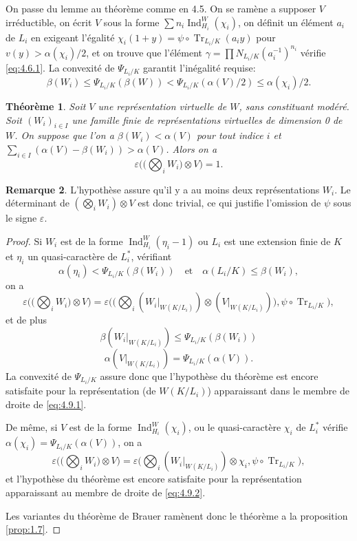\documentclass[12pt,a4paper]{article}
\theoremstyle{plain}
\newtheorem{theorem}{Th\'eor\`eme}[section]
\theoremstyle{definition}
\newtheorem{remark}[theorem]{Remarque}
\theoremstyle{remark}
\DeclareMathOperator{\Ind}{Ind}
\DeclareMathOperator{\Tr}{Tr}
\providecommand{\Tr}{\operatorname{Tr}}
\begin{document}
On passe du lemme au th\'eor\`eme comme en 4.5. On se ram\`ene a supposer $V$ irr\'eductible, on \'ecrit $V$ sous la forme $\sum n_i \Ind_{H_i}^W(\chi_i)$, on d\'efinit un \'el\'ement $a_i$ de $L_i$ en exigeant l'\'egalit\'e $\chi_i(1+y) = \psi \circ \Tr_{L_i/K}(a_i y)$ pour $v(y) > \alpha(\chi_i)/2$, et on trouve que l'\'el\'ement $\gamma = \prod N_{L_i/K}(a_i^{-1})^{n_i}$ v\'erifie \eqref{eq:4.6.1}. La convexit\'e de $\Psi_{L_i/K}$ garantit l'in\'egalit\'e requise:
\[
\beta(W_i) \leq \Psi_{L_i/K}(\beta(W)) < \Psi_{L_i/K}(\alpha(V)/2) \leq \alpha(\chi_i)/2.
\]

\begin{theorem}\label{thm:4.9}
Soit $V$ une repr\'esentation virtuelle de $W$, sans constituant mod\'er\'e. Soit $(W_i)_{i \in I}$ une famille finie de repr\'esentations virtuelles de dimension 0 de $W$. On suppose que l'on a $\beta(W_i) < \alpha(V)$ pour tout indice $i$ et $\sum_{i \in I}(\alpha(V) - \beta(W_i)) > \alpha(V)$. Alors on a
\[
\varepsilon\biggl(\bigl(\bigotimes_i W_i\bigr) \otimes V\biggr) = 1.
\]
\end{theorem}

\begin{remark}
L'hypoth\`ese assure qu'il y a au moins deux repr\'esentations $W_i$. Le d\'eterminant de $(\bigotimes_i W_i) \otimes V$ est donc trivial, ce qui justifie l'omission de $\psi$ sous le signe $\varepsilon$.
\end{remark}

\begin{proof}
Si $W_i$ est de la forme $\Ind_{H_i}^W(\eta_i - 1)$ ou $L_i$ est une extension finie de $K$ et $\eta_i$ un quasi-caract\`ere de $L_i^*$, v\'erifiant
\[
\alpha(\eta_i) < \Psi_{L_i/K}(\beta(W_i)) \quad \text{et} \quad \alpha(L_i/K) \leq \beta(W_i),
\]
on a
\begin{equation}\label{eq:4.9.1}
\varepsilon\biggl(\bigl(\bigotimes_i W_i\bigr) \otimes V\biggr) = \varepsilon\biggl(\bigl(\bigotimes_i (W_i|_{W(K/L_i)}) \otimes (V|_{W(K/L_i)})\bigr), \psi \circ \Tr_{L_i/K}\biggr),
\end{equation}
et de plus
\[
\beta(W_i|_{W(K/L_i)}) \leq \Psi_{L_i/K}(\beta(W_i))
\]
\[
\alpha(V|_{W(K/L_i)}) = \Psi_{L_i/K}(\alpha(V)).
\]
La convexit\'e de $\Psi_{L_i/K}$ assure donc que l'hypoth\`ese du th\'eor\`eme est encore satisfaite pour la repr\'esentation (de $W(K/L_i)$) apparaissant dans le membre de droite de \eqref{eq:4.9.1}.

De m\^eme, si $V$ est de la forme $\Ind_{H_i}^W(\chi_i)$, ou le quasi-caract\`ere $\chi_i$ de $L_i^*$ v\'erifie $\alpha(\chi_i) = \Psi_{L_i/K}(\alpha(V))$, on a
\begin{equation}\label{eq:4.9.2}
\varepsilon\biggl(\bigl(\bigotimes_i W_i\bigr) \otimes V\biggr) = \varepsilon\biggl(\bigotimes_i (W_i|_{W(K/L_i)}) \otimes \chi_i, \psi \circ \Tr_{L_i/K}\biggr),
\end{equation}
et l'hypoth\`ese du th\'eor\`eme est encore satisfaite pour la repr\'esentation apparaissant au membre de droite de \eqref{eq:4.9.2}.

Les variantes du th\'eor\`eme de Brauer ram\`enent donc le th\'eor\`eme a la proposition \ref{prop:1.7}.
\end{proof}
\end{document}
